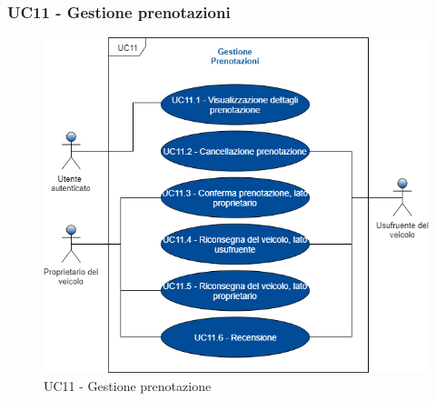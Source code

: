 \newpage
\subsubsection{UC11 - Gestione prenotazioni}
\begin{figure}[h]
	\includegraphics[width=12cm]{res/images/UC11Prenotazione.png}
	\centering
	\caption{UC11 - Gestione prenotazione}
\end{figure}
